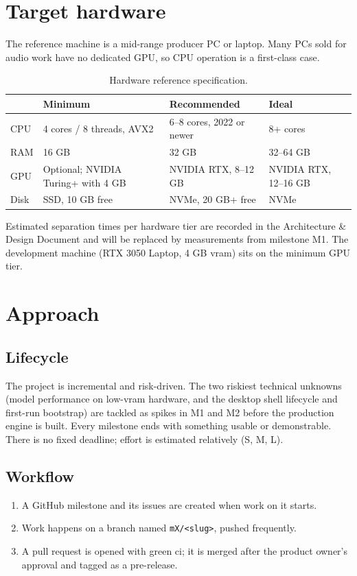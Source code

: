 \documentclass{covermaker}
\begin{document}
\chapter{Target hardware}
The reference machine is a mid-range producer PC or laptop. Many PCs sold for
audio work have no dedicated GPU, so CPU operation is a first-class case.

\begin{table}[h]
\centering
\begin{tabularx}{\linewidth}{@{}lYYY@{}}
\toprule
 & \textbf{Minimum} & \textbf{Recommended} & \textbf{Ideal} \\
\midrule
CPU & 4 cores / 8 threads, AVX2 & 6--8 cores, 2022 or newer & 8+ cores \\
RAM & 16 GB & 32 GB & 32--64 GB \\
GPU & Optional; NVIDIA Turing+ with 4 GB & NVIDIA RTX, 8--12 GB & NVIDIA RTX, 12--16 GB \\
Disk & SSD, 10 GB free & NVMe, 20 GB+ free & NVMe \\
\bottomrule
\end{tabularx}
\caption{Hardware reference specification.}
\end{table}

Estimated separation times per hardware tier are recorded in the Architecture
\& Design Document and will be replaced by measurements from milestone M1. The
development machine (RTX 3050 Laptop, 4 GB \gls{vram}) sits on the minimum GPU
tier.

\chapter{Approach}

\section{Lifecycle}
The project is incremental and risk-driven. The two riskiest technical unknowns
(model performance on low-\gls{vram} hardware, and the desktop shell lifecycle
and first-run bootstrap) are tackled as spikes in M1 and M2 before the
production engine is built. Every milestone ends with something usable or
demonstrable. There is no fixed deadline; effort is estimated relatively
(S, M, L).

\section{Workflow}
\begin{enumerate}
  \item A GitHub milestone and its issues are created when work on it starts.
  \item Work happens on a branch named \texttt{mX/<slug>}, pushed frequently.
  \item A pull request is opened with green \gls{ci}; it is merged after the
        product owner's approval and tagged as a pre-release.
\end{enumerate}
\end{document}
